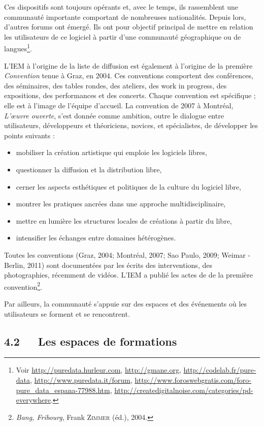 \documentclass{FramateX}
\begin{document}
\begin{refsection}
Ces dispositifs sont toujours opérants et, avec le temps, ils
rassemblent une communauté importante comportant de nombreuses
nationalités. Depuis lors, d'autres forums ont émergé. Ils ont pour
objectif principal de mettre en relation les utilisateurs de ce
logiciel à partir d'une communauté géographique ou de
langues\footnote{Voir \url{http://puredata.hurleur.com}, \url{http://gmane.org},
\url{http://codelab.fr/pure-data}, \url{http://www.puredata.it/forum},
\url{http://www.foroswebgratis.com/foro-pure\_data\_espana-77988.htm}, \url{http://createdigitalnoise.com/categories/pd-everywhere}.}.

L'IEM à l'origine de la liste de diffusion est également à l'origine de
la première \textit{Convention} tenue à Graz, en 2004. Ces conventions comportent des
conférences, des séminaires, des tables rondes, des ateliers, des
work in progress, des expositions, des performances et des concerts.
Chaque convention est spécifique ; elle est à l'image de l'équipe
d'accueil. La convention de 2007 à Montréal, \textit{L'œuvre ouverte}, s'est
donnée comme ambition, outre le dialogue entre utilisateurs,
développeurs et théoriciens, novices, et spécialistes, de développer
les points suivants :

\begin{itemize}
\item mobiliser la création artistique qui emploie les logiciels libres,
\item questionner la diffusion et la distribution libre,
\item cerner les aspects esthétiques et politiques de la culture du
logiciel libre,
\item montrer les pratiques ancrées dans une approche
multidisciplinaire,
\item mettre en lumière les structures locales de créations à partir du
libre,
\item intensifier les échanges entre domaines hétérogènes. 
\end{itemize}
Toutes les conventions (Graz, 2004; Montréal, 2007; Sao Paulo, 2009;
Weimar - Berlin, 2011) sont documentées par les écrits des
interventions, des photographies, récemment de vidéos. L'IEM a publié
les actes de de la première convention\footnote{\textit{Bang, Fribourg}, Frank \textsc{Zimmer} (éd.), 2004.}.

Par ailleurs, la communauté s'appuie sur des espaces et
des événements où les utilisateurs se forment et se rencontrent.

\subsection*{4.2~~~Les espaces de formations}
{}


\end{refsection}
\end{document}

